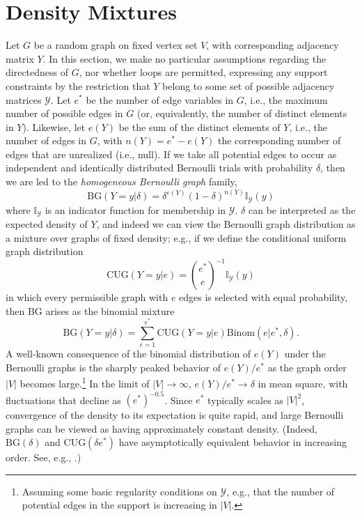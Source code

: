 \documentclass[11pt]{article}
\newcommand{\BG}{\ensuremath{\mathrm{BG}}\xspace}
\newcommand{\CUG}{\ensuremath{\mathrm{CUG}}\xspace}
\newcommand{\binomd}{\ensuremath{\mathrm{Binom}}\xspace}
\begin{document}
\section{Density Mixtures} \label{sec_denmix}

Let $G$ be a random graph on fixed vertex set $V$, with corresponding adjacency matrix $Y$.  In this section, we make no particular assumptions regarding the directedness of $G$, nor whether loops are permitted, expressing any support constraints by the restriction that $Y$ belong to some set of possible adjacency matrices $\mathcal{Y}$.  Let $e^*$ be the number of edge variables in $G$, i.e., the maximum number of possible edges in $G$ (or, equivalently, the number of distinct elements in $Y$).  Likewise, let $e(Y)$ be the sum of the distinct elements of $Y$, i.e., the number of edges in $G$, with $n(Y)=e^*-e(Y)$ the corresponding number of edges that are unrealized (i.e., null).  If we take all potential edges to occur as independent and identically distributed Bernoulli trials with probability $\delta$, then we are led to the \emph{homogeneous Bernoulli graph} family,
\begin{equation*}
\BG(Y=y|\delta) = \delta^{e(Y)}(1-\delta)^{n(Y)} \mathbb{I}_\mathcal{Y}(y)
\end{equation*}
where $\mathbb{I}_\mathcal{Y}$ is an indicator function for membership in $\mathcal{Y}$.  $\delta$ can be interpreted as the expected density of $Y$, and indeed we can view the Bernoulli graph distribution as a mixture over graphs of fixed density; e.g., if we define the conditional uniform graph distribution
\begin{equation*}
\CUG(Y=y|e) = \binom{e^*}{e}^{-1}\mathbb{I}_\mathcal{Y}(y)
\end{equation*}
in which every permissible graph with $e$ edges is selected with equal probability, then \BG arises as the binomial mixture
\begin{equation*}
\BG(Y=y|\delta) = \sum_{e=1}^{e^*} \CUG(Y=y|e) \binomd(e|e^*,\delta).
\end{equation*}
A well-known consequence of the binomial distribution of $e(Y)$ under the Bernoulli graphs is the sharply peaked behavior of $e(Y)/e^*$ as the graph order $|V|$ becomes large.\footnote{Assuming some basic regularity conditions on $\mathcal{Y}$, e.g., that the number of potential edges in the support is increasing in $|V|$.}  In the limit of $|V|\to \infty$, $e(Y)/e^* \to \delta$ in mean square, with fluctuations that decline as $(e^*)^{-0.5}$.  Since $e^*$ typically scales as $|V|^2$, convergence of the density to its expectation is quite rapid, and large Bernoulli graphs can be viewed as having approximately constant density.  (Indeed, $\BG(\delta)$ and $\CUG(\delta e^*)$ have asymptotically equivalent behavior in increasing order.  See, e.g., \citet{bollobas:bk:2001}.)
\end{document}
